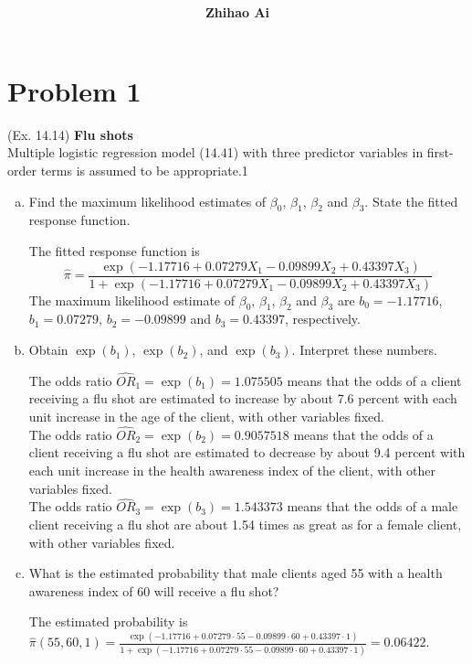 \documentclass[10pt]{report}
\title{
	\vspace{2in}
	\textmd{\textbf{\hwCourse\\\hwTitle}}\\
	\vspace{0.3in}\large{\textit{\hmClassInstructor}}
	\vspace{3in}
}
\author{\textbf{Zhihao Ai}}
\date{}
\begin{document}
\maketitle

\section*{Problem 1}
(Ex. 14.14) \textbf{Flu shots}\\
Multiple logistic regression model (14.41) with three predictor variables in first-order terms is assumed to be appropriate.1
\begin{enumerate}[a.]
	\item 
	Find the maximum likelihood estimates of $\beta_0$, $\beta_1$, $\beta_2$ and $\beta_3$. State the fitted response function.
	
	The fitted response function is 
	\[
	\hat{\pi} = \frac{\exp(-1.17716 + 0.07279 X_1 - 0.09899 X_2 + 0.43397 X_3)}{1 + \exp(-1.17716 + 0.07279 X_1 - 0.09899 X_2 + 0.43397 X_3)}
	\]
	The maximum likelihood estimate of $\beta_0$, $\beta_1$, $\beta_2$ and $\beta_3$ are $b_0 = -1.17716$, $b_1 = 0.07279$, $b_2 = -0.09899$ and $b_3 = 0.43397$, respectively.
	
	\item 
	Obtain $\exp(b_1)$, $\exp(b_2)$, and $\exp(b_3)$. Interpret these numbers.
	
	The odds ratio $\widehat{OR}_1 = \exp(b_1) = 1.075505$ means that the odds of a client receiving a flu shot are estimated to increase by about 7.6 percent with each unit increase in the age of the client, with other variables fixed.\\
	The odds ratio $\widehat{OR}_2 = \exp(b_2) = 0.9057518$ means that the odds of a client receiving a flu shot are estimated to decrease by about 9.4 percent with each unit increase in the health awareness index of the client, with other variables fixed.\\
	The odds ratio $\widehat{OR}_3 = \exp(b_3) = 1.543373$ means that the odds of a male client receiving a flu shot are about 1.54 times as great as for a female client, with other variables fixed.
	
	\item 
	What is the estimated probability that male clients aged 55 with a health awareness index of 60 will receive a flu shot?
	
	The estimated probability is $\hat{\pi}(55, 60, 1) = \frac{\exp(-1.17716 + 0.07279\cdot 55 - 0.09899\cdot 60 + 0.43397\cdot 1)}{1 + \exp(-1.17716 + 0.07279\cdot 55 - 0.09899\cdot 60 + 0.43397\cdot 1)} = 0.06422$.
\end{enumerate}
\end{document}
